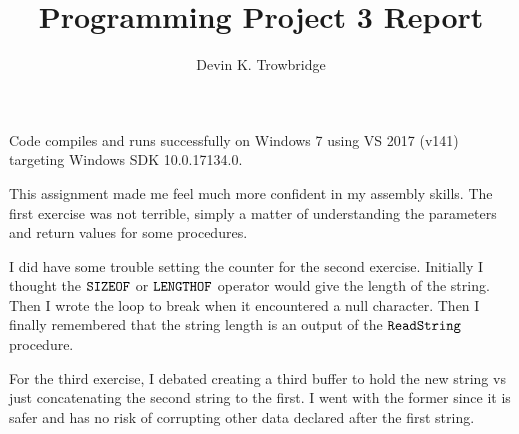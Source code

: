 \documentclass[a4paper,10pt]{article}
\title{Programming Project 3 Report}
\author{Devin K. Trowbridge}
\begin{document}
\maketitle

Code compiles and runs successfully on Windows 7 using VS 2017 (v141) targeting Windows SDK 10.0.17134.0.

This assignment made me feel much more confident in my assembly skills. The first exercise was not terrible, simply a matter of understanding the parameters and return values for some procedures.

I did have some trouble setting the counter for the second exercise. Initially I thought the $\verb|SIZEOF|$ or $\verb|LENGTHOF|$ operator would give the length of the string. Then I wrote the loop to break when it encountered a null character. Then I finally remembered that the string length is an output of the $\verb|ReadString|$ procedure.

For the third exercise, I debated creating a third buffer to hold the new string vs just concatenating the second string to the first. I went with the former since it is safer and has no risk of corrupting other data declared after the first string.
\end{document}

